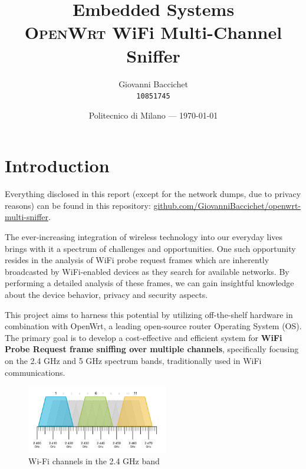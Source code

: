 \documentclass{article}
\title{Embedded Systems \\ \textsc{OpenWrt} WiFi Multi-Channel Sniffer} %
\author{Giovanni Baccichet \\ \raisebox{0.1\height}{\fontsize{8}{8}\faUser} \texttt{10851745}} %
\date{Politecnico di Milano --- \today} %
\begin{document}
\maketitle %


\section{Introduction} %

\begin{warn}
    Everything disclosed in this report (except for the network dumps, due to privacy reasons) can be found in this repository: \href{https://github.com/GiovanniBaccichet/openwrt-multi-sniffer}{\raisebox{0.1\height}{\fontsize{8}{8}\faLink} github.com/GiovanniBaccichet/openwrt-multi-sniffer}.
\end{warn}

The ever-increasing integration of wireless technology into our everyday lives brings with it a spectrum of challenges and opportunities. One such opportunity resides in the analysis of WiFi probe request frames which are inherently broadcasted by WiFi-enabled devices as they search for available networks. By performing a detailed analysis of these frames, we can gain insightful knowledge about the device behavior, privacy and security aspects.

This project aims to harness this potential by utilizing off-the-shelf hardware in combination with OpenWrt, a leading open-source router Operating System (OS). The primary goal is to develop a cost-effective and efficient system for \textbf{WiFi Probe Request frame sniffing over multiple channels}, specifically focusing on the 2.4 GHz and 5 GHz spectrum bands, traditionally used in WiFi communications. 

\begin{figure}[h]
    \centering
    \includegraphics[width=0.55\textwidth]{assets/2GHz-channels.png}
    \caption{Wi-Fi channels in the 2.4 GHz band}
    \label{fig:wifi-channels}
\end{figure}
\end{document}
